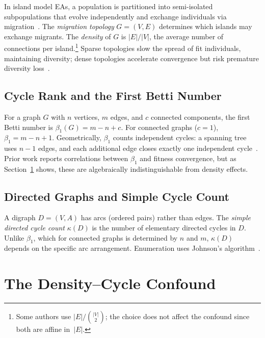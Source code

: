 \documentclass{llncs}
\begin{document}
In island model EAs, a population is partitioned into semi-isolated
subpopulations that evolve independently and exchange individuals via
migration~\cite{tomassini2005spatially}. The \emph{migration topology}
$G = (V, E)$ determines which islands may exchange migrants. The \emph{density}
of $G$ is $|E|/|V|$, the average number of connections per
island.\footnote{Some authors use $|E|/\binom{|V|}{2}$; the choice does not
affect the confound since both are affine in~$|E|$.} Sparse topologies
slow the spread of fit individuals, maintaining diversity; dense topologies
accelerate convergence but risk premature diversity
loss~\cite{alba2002parallel,skolicki2005influence}.

\subsection{Cycle Rank and the First Betti Number}

For a graph $G$ with $n$ vertices, $m$ edges, and $c$ connected components, the
first Betti number is $\beta_1(G) = m - n + c$.
For connected graphs ($c = 1$), $\beta_1 = m - n + 1$. Geometrically, $\beta_1$
counts independent cycles: a spanning tree uses $n-1$ edges, and each additional
edge closes exactly one independent
cycle~\cite{hatcher2002algebraic}. Prior work reports correlations
between $\beta_1$ and fitness convergence, but as Section~\ref{sec:confound}
shows, these are algebraically indistinguishable from density effects.

\subsection{Directed Graphs and Simple Cycle Count}

A digraph $D = (V, A)$ has arcs (ordered pairs) rather than edges. The
\emph{simple directed cycle count} $\kappa(D)$ is the number of elementary
directed cycles in $D$. Unlike $\beta_1$, which for connected graphs is
determined by $n$ and $m$, $\kappa(D)$ depends on the specific arc arrangement.
Enumeration uses Johnson's algorithm~\cite{johnson1975finding}.

\section{The Density--Cycle Confound}
\label{sec:confound}
\end{document}

